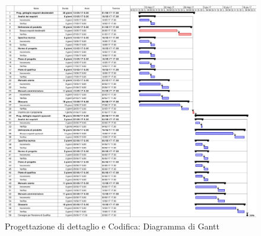 \documentclass[../PianoDiProgetto.tex]{subfiles}
\begin{document}
		\begin{figure}[H]
			\centering
			\includegraphics[scale=0.7]{Figures/Gantt_DettaglioOpz}
			\caption{Progettazione di dettaglio e Codifica: Diagramma di Gantt}
		\end{figure}
	
	
		
\end{document}
